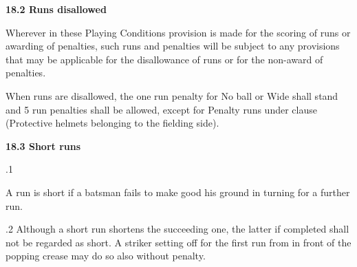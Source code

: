 \documentclass[12pt]{article}
\begin{document}
\vspace{\baselineskip}
{\fontsize{11pt}{13.2pt}\selectfont \textbf{18.2 \tabto{0.47in} Runs disallowed}\par}\par


\vspace{\baselineskip}
\begin{adjustwidth}{0.0in}{0.19in}
{\fontsize{9pt}{10.8pt}\selectfont Wherever in these Playing Conditions provision is made for the scoring of runs or awarding of penalties, such runs and penalties will be subject to any provisions that may be applicable for the disallowance of runs or for the non-award of penalties.\par}\par

\end{adjustwidth}


\vspace{\baselineskip}
\begin{adjustwidth}{0.0in}{0.17in}
{\fontsize{9pt}{10.8pt}\selectfont When runs are disallowed, the one run penalty for No ball or Wide shall stand and 5 run penalties shall be allowed, except for Penalty runs under clause (Protective helmets belonging to the fielding side).\par}\par

\end{adjustwidth}


\vspace{\baselineskip}
{\fontsize{11pt}{13.2pt}\selectfont \textbf{18.3 \tabto{0.47in} Short runs}\par}\par


\vspace{\baselineskip}
{\fontsize{9pt}{10.8pt}.1 \tabto{0.49in} {\fontsize{8pt}{9.6pt}\selectfont A run is short if a batsman fails to make good his ground in turning for a further run.\par}\par}\par


\vspace{\baselineskip}
\begin{adjustwidth}{0.5in}{0.14in}
{\fontsize{9pt}{10.8pt}.2 \tabto{0.49in} Although a short run shortens the succeeding one, the latter if completed shall not be regarded as short. A striker setting off for the first run from in front of the popping crease may do so also without penalty.\par}\par

\end{adjustwidth}
\end{document}
